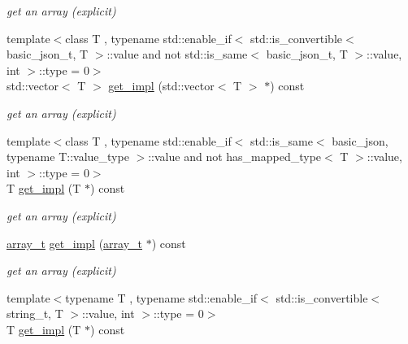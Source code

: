 \begin{DoxyCompactItemize}
\begin{DoxyCompactList}\small\item\em get an array (explicit) \end{DoxyCompactList}\item 
{\footnotesize template$<$class T , typename std\+::enable\+\_\+if$<$                                                              std\+::is\+\_\+convertible$<$ basic\+\_\+json\+\_\+t, T $>$\+::value and                                                           not std\+::is\+\_\+same$<$ basic\+\_\+json\+\_\+t, T $>$\+::value, int $>$\+::type  = 0$>$ }\\std\+::vector$<$ T $>$ \hyperlink{classnlohmann_1_1basic__json_a279a90a7e87685de7f1e0f4c8cc3666d}{get\+\_\+impl} (std\+::vector$<$ T $>$ $\ast$) const 
\begin{DoxyCompactList}\small\item\em get an array (explicit) \end{DoxyCompactList}\item 
{\footnotesize template$<$class T , typename std\+::enable\+\_\+if$<$                                                              std\+::is\+\_\+same$<$ basic\+\_\+json, typename T\+::value\+\_\+type $>$\+::value and                                                           not has\+\_\+mapped\+\_\+type$<$ T $>$\+::value, int $>$\+::type  = 0$>$ }\\T \hyperlink{classnlohmann_1_1basic__json_a87cb2949cc4e33885debfaa68780ec9b}{get\+\_\+impl} (T $\ast$) const 
\begin{DoxyCompactList}\small\item\em get an array (explicit) \end{DoxyCompactList}\item 
\hyperlink{classnlohmann_1_1basic__json_ab00b882d39306d663c23dab110f5cae0}{array\+\_\+t} \hyperlink{classnlohmann_1_1basic__json_a9ac8eb6917c25b9dce0093ae6cc06b88}{get\+\_\+impl} (\hyperlink{classnlohmann_1_1basic__json_ab00b882d39306d663c23dab110f5cae0}{array\+\_\+t} $\ast$) const 
\begin{DoxyCompactList}\small\item\em get an array (explicit) \end{DoxyCompactList}\item 
{\footnotesize template$<$typename T , typename std\+::enable\+\_\+if$<$                                                              std\+::is\+\_\+convertible$<$ string\+\_\+t, T $>$\+::value, int $>$\+::type  = 0$>$ }\\T \hyperlink{classnlohmann_1_1basic__json_a87cb2949cc4e33885debfaa68780ec9b}{get\+\_\+impl} (T $\ast$) const 

\end{DoxyCompactItemize}
